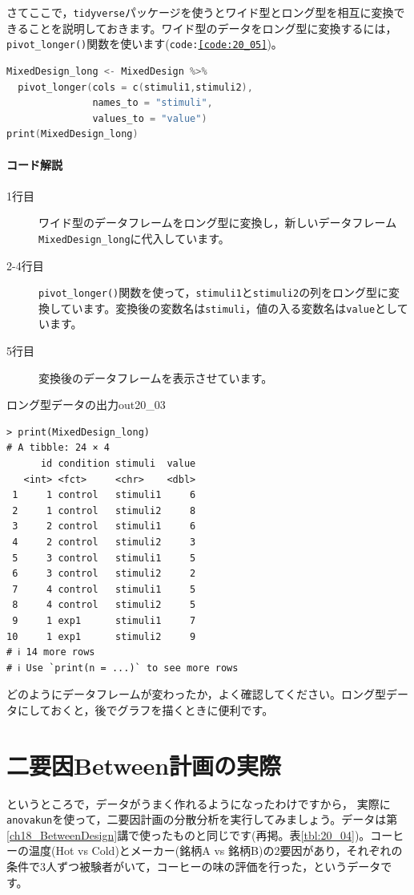 \documentclass{ltjbook}
\begin{document}
さてここで，\verb|tidyverse|パッケージを使うとワイド型とロング型を相互に変換できることを説明しておきます。ワイド型のデータをロング型に変換するには，\verb|pivot_longer()|関数を使います(\texttt{code:\ref{code:20_05}})。

\begin{lstlisting}[language=c++,label={code:20_05},caption={ワイド型からロング型への変換}]
MixedDesign_long <- MixedDesign %>%
  pivot_longer(cols = c(stimuli1,stimuli2),
               names_to = "stimuli",
               values_to = "value")
print(MixedDesign_long)
\end{lstlisting}

\paragraph{コード解説}
\begin{description}
    \item[1行目] ワイド型のデータフレームをロング型に変換し，新しいデータフレーム\texttt{MixedDesign\_long}に代入しています。
    \item[2-4行目] \verb|pivot_longer()|関数を使って，\texttt{stimuli1}と\texttt{stimuli2}の列をロング型に変換しています。変換後の変数名は\texttt{stimuli}，値の入る変数名は\texttt{value}としています。
    \item[5行目] 変換後のデータフレームを表示させています。
\end{description}

\begin{Rscreen}{ロング型データの出力}{out20_03}
\begin{verbatim}
> print(MixedDesign_long)
# A tibble: 24 × 4
      id condition stimuli  value
   <int> <fct>     <chr>    <dbl>
 1     1 control   stimuli1     6
 2     1 control   stimuli2     8
 3     2 control   stimuli1     6
 4     2 control   stimuli2     3
 5     3 control   stimuli1     5
 6     3 control   stimuli2     2
 7     4 control   stimuli1     5
 8     4 control   stimuli2     5
 9     1 exp1      stimuli1     7
10     1 exp1      stimuli2     9
# ℹ 14 more rows
# ℹ Use `print(n = ...)` to see more rows
\end{verbatim}
\end{Rscreen}
どのようにデータフレームが変わったか，よく確認してください。ロング型データにしておくと，後でグラフを描くときに便利です。

\section{二要因Between計画の実際}
\label{sec:20_between2}
というところで，データがうまく作れるようになったわけですから，
実際に\verb|anovakun|を使って，二要因計画の分散分析を実行してみましょう。データは第\ref{ch18_BetweenDesign}講で使ったものと同じです(再掲。表\ref{tbl:20_04})。コーヒーの温度(Hot vs Cold)とメーカー(銘柄A vs 銘柄B)の2要因があり，それぞれの条件で3人ずつ被験者がいて，コーヒーの味の評価を行った，というデータです。
\end{document}
